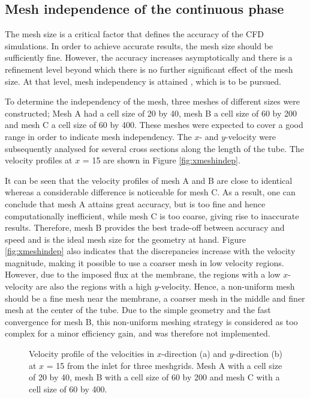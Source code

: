 \subsection{Mesh independence of the continuous phase \label{sec:MeshIndep}}
The mesh size is a critical factor that defines the accuracy of the \gls{CFD} simulations. In order to achieve accurate results, the mesh size should be sufficiently fine. However, the accuracy increases asymptotically and there is a refinement level beyond which there is no further significant effect of the mesh size. At that level, mesh independency is attained \citep{Roache1997}, which is to be pursued. \par
To determine the independency of the mesh, three meshes of different sizes were constructed; Mesh A had a cell size of \unit{20}{\milli\metre} by \unit{40}{\micro\metre}, mesh B a cell size of \unit{60}{\milli\metre} by \unit{200}{\micro\metre} and mesh C a cell size of \unit{60}{\milli\metre} by \unit{400}{\micro\metre}. These meshes were expected to cover a good range in order to indicate mesh independency. The $x$- and $y$-velocity were subsequently analysed for several cross sections along the length of the tube. The velocity profiles at $x$ = \unit{15}{\centi\metre} are shown in Figure \ref{fig:xmeshindep}. \par
It can be seen that the velocity profiles of mesh A and B are close to identical whereas a considerable difference is noticeable for mesh C. As a result, one can conclude that mesh A attains great accuracy, but is too fine and hence computationally inefficient, while mesh C is too coarse, giving rise to inaccurate results. Therefore, mesh B provides the best trade-off between accuracy and speed and is the ideal mesh size for the geometry at hand. Figure \ref{fig:xmeshindep}  also indicates that the discrepancies increase with the velocity magnitude, making it possible to use a coarser mesh in low velocity regions. However, due to the imposed flux at the membrane, the regions with a low $x$-velocity are also the regions with a high $y$-velocity. Hence, a non-uniform mesh should be a fine mesh near the membrane, a coarser mesh in the middle and finer mesh at the center of the tube. Due to the simple geometry and the fast convergence for mesh B, this non-uniform meshing strategy is considered as too complex for a minor efficiency gain, and was therefore not implemented. 
\begin{figure}[H]
\centerline{
    }
\centerline{
    }
 \caption{Velocity profile of the velocities in $x$-direction (a) and $y$-direction (b) at $x$ = \unit{15}{\centi\metre} from the inlet for three meshgrids. Mesh A with a cell size of  \unit{20}{\milli\metre} by \unit{40}{\micro\metre}, mesh B with a cell size of \unit{60}{\milli\metre} by \unit{200}{\micro\metre} and mesh C with a cell size of \unit{60}{\milli\metre} by \unit{400}{\micro\metre}. \label{fig:xmeshindep}\label{fig:ymeshindep}}
\end{figure}
